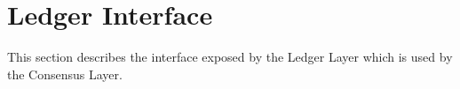 \section{Ledger Interface}
\label{sec:ledger-interface}

This section describes the interface exposed by the Ledger Layer which is
used by the Consensus Layer.


